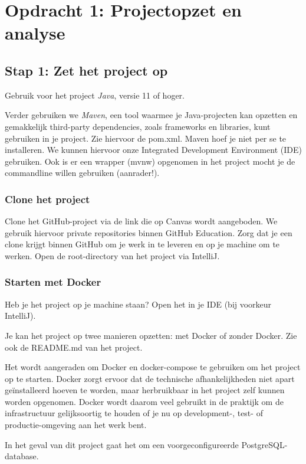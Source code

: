 \documentclass[dutch,a4paper,12pt,doubleside]{book}
\begin{document}
\setcounter{chapter}{0}
\chapter{Opdracht 1: Projectopzet en analyse}

\section{Stap 1: Zet het project op}
Gebruik voor het project \textit{Java}, versie 11 of hoger.

Verder gebruiken we \textit{Maven}, een tool waarmee je Java-projecten kan opzetten
en gemakkelijk third-party dependencies, zoals frameworks en libraries, kunt 
gebruiken in je project. Zie hiervoor de pom.xml. Maven hoef je niet per se te 
installeren. We kunnen hiervoor onze Integrated Development Environment (IDE) gebruiken.
Ook is er een wrapper (mvnw) opgenomen in het project mocht je de commandline willen gebruiken (aanrader!). 

\subsection{Clone het project}
Clone het GitHub-project via de link die op Canvas wordt aangeboden.
We gebruik hiervoor private repositories binnen GitHub Education.
Zorg dat je een clone krijgt binnen GitHub om je werk in te leveren 
en op je machine om te werken. Open de root-directory van het project
via IntelliJ.

\subsection{Starten met Docker}
Heb je het project op je machine staan? Open het in je IDE (bij voorkeur IntelliJ).

Je kan het project op twee manieren opzetten: met Docker of zonder Docker. 
Zie ook de README.md van het project. 

Het wordt aangeraden om Docker en docker-compose te gebruiken om het project op te starten.
Docker zorgt ervoor dat de technische afhankelijkheden niet apart geïnstalleerd hoeven te worden,
maar herbruikbaar in het project zelf kunnen worden opgenomen.
Docker wordt daarom veel gebruikt in de praktijk om de infrastructuur gelijksoortig te houden 
of je nu op development-, test- of productie-omgeving aan het werk bent.

In het geval van dit project gaat het om een voorgeconfigureerde PostgreSQL-database.
\end{document}
